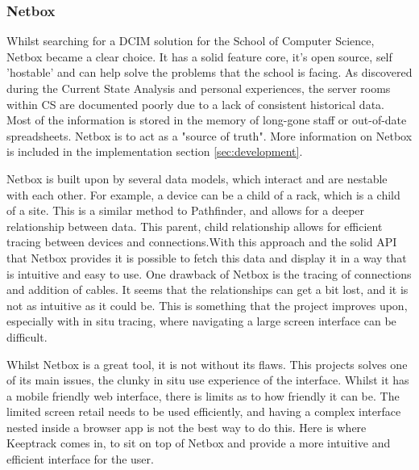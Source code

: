 \documentclass [11pt,a4paper]{article}
\begin{document}
\subsubsection{Netbox}
\label{sec:netbox}
Whilst searching for a DCIM solution for the School of Computer Science, Netbox became a clear choice. It has a solid feature core, it's open source, self 'hostable' and can help solve the problems that the school is facing. As discovered during the Current State Analysis and personal experiences, the server rooms within CS are documented poorly due to a lack of consistent historical data. Most of the information is stored in the memory of long-gone staff or out-of-date spreadsheets. Netbox is to act as a "source of truth"\cite{Netbox}. More information on Netbox is included in the implementation section \ref{sec:development}. 

Netbox is built upon by several data models, which interact and are nestable with each other. For example, a device can be a child of a rack, which is a child of a site. This is a similar method to Pathfinder, and allows for a deeper relationship between data. This parent, child relationship allows for efficient tracing between devices and connections.With this approach and the solid API that Netbox provides it is possible to fetch this data and display it in a way that is intuitive and easy to use. One drawback of Netbox is the tracing of connections and addition of cables. It seems that the relationships can get a bit lost, and it is not as intuitive as it could be. This is something that the project improves upon, especially with in situ tracing, where navigating a large screen interface can be difficult. 

Whilst Netbox is a great tool, it is not without its flaws. This projects solves one of its main issues, the clunky in situ use experience of the interface. Whilst it has a mobile friendly web interface, there is limits as to how friendly it can be. The limited screen retail needs to be used efficiently, and having a complex interface nested inside a browser app is not the best way to do this. Here is where Keeptrack comes in, to sit on top of Netbox and provide a more intuitive and efficient interface for the user.
\end{document}
